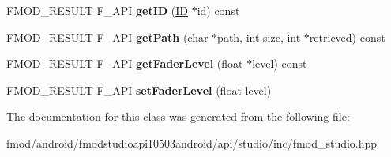 \begin{DoxyCompactItemize}
\item 
\hypertarget{class_f_m_o_d_1_1_studio_1_1_v_c_a_abd89b599f285b4ef456f2d0bb5be1969}{F\+M\+O\+D\+\_\+\+R\+E\+S\+U\+L\+T F\+\_\+\+A\+P\+I {\bfseries get\+I\+D} (\hyperlink{struct_f_m_o_d___g_u_i_d}{I\+D} $\ast$id) const }\label{class_f_m_o_d_1_1_studio_1_1_v_c_a_abd89b599f285b4ef456f2d0bb5be1969}

\item 
\hypertarget{class_f_m_o_d_1_1_studio_1_1_v_c_a_a42ceb60f83131c48b36265aef592d402}{F\+M\+O\+D\+\_\+\+R\+E\+S\+U\+L\+T F\+\_\+\+A\+P\+I {\bfseries get\+Path} (char $\ast$path, int size, int $\ast$retrieved) const }\label{class_f_m_o_d_1_1_studio_1_1_v_c_a_a42ceb60f83131c48b36265aef592d402}

\item 
\hypertarget{class_f_m_o_d_1_1_studio_1_1_v_c_a_a26e3d753fb1962b13bf96c14a864c015}{F\+M\+O\+D\+\_\+\+R\+E\+S\+U\+L\+T F\+\_\+\+A\+P\+I {\bfseries get\+Fader\+Level} (float $\ast$level) const }\label{class_f_m_o_d_1_1_studio_1_1_v_c_a_a26e3d753fb1962b13bf96c14a864c015}

\item 
\hypertarget{class_f_m_o_d_1_1_studio_1_1_v_c_a_a24b9659c4ebb3b197377b864f13e04f6}{F\+M\+O\+D\+\_\+\+R\+E\+S\+U\+L\+T F\+\_\+\+A\+P\+I {\bfseries set\+Fader\+Level} (float level)}\label{class_f_m_o_d_1_1_studio_1_1_v_c_a_a24b9659c4ebb3b197377b864f13e04f6}

\end{DoxyCompactItemize}


The documentation for this class was generated from the following file\+:\begin{DoxyCompactItemize}
\item 
fmod/android/fmodstudioapi10503android/api/studio/inc/fmod\+\_\+studio.\+hpp\end{DoxyCompactItemize}
